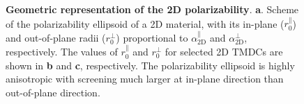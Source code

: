 \begin{figure}[H]
  \centering
  \caption{\label{fig-ellip} \textbf{Geometric representation of the
      2D polarizability}. \textbf{a}. Scheme of the polarizability
    ellipsoid of a 2D material, with its in-plane
    ($r_{0}^{\parallel}$) and out-of-plane radii
    ($r_{\mathrm{0}}^{\perp}$) proportional to
    $\alpha_{\mathrm{2D}}^{\parallel}$ and
    $\alpha_{\mathrm{2D}}^{\perp}$, respectively.  The values of
    $r_{0}^{\parallel}$ and $r_{0}^{\perp}$ for selected 2D TMDCs are
    shown in \textbf{b} and \textbf{c}, respectively.  The
    polarizability ellipsoid is highly anisotropic with screening much
    larger at in-plane direction than out-of-plane direction.}
\end{figure}







